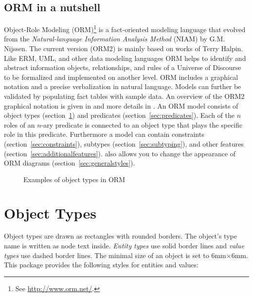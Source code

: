 \documentclass[a4paper,10pt]{article}
\begin{document}
\subsection*{ORM in a nutshell}
Object-Role Modeling (ORM)\footnote{See \url{http://www.orm.net/}.} is a fact-oriented modeling language that evolved from the \textit{Natural-language Information Analysis Method} (NIAM) by G.M. Nijssen. The current version (ORM2) is mainly based on works of Terry Halpin. Like ERM, UML, and other data modeling languages ORM helps to identify and abstract information objects, relationships, and rules of a Universe of Discourse to be formalized and implemented on another level. ORM includes a graphical notation and a precise verbalization in natural language. Models can further be validated by populating fact tables with sample data. An overview of the ORM2 graphical notation is given in \cite{Halpin2005} and more details in \cite{Halpin2008}. An ORM model consists of object types (section~\ref{sec:objecttypes}) and predicates  (section~\ref{sec:predicates}). Each of the $n$ roles of an $n$-ary predicate is connected to an object type that plays the specific role in this predicate. Furthermore a model can contain constraints (section~\ref{sec:constraints}), subtypes (section~\ref{sec:subtyping}), and other features (section~\ref{sec:additionalfeatures}). \tkzorm also allows you to change the appearance of ORM diagrams (section~\ref{sec:generalstyles}).

\begin{figure}[ht]
  \centering
  \caption{Examples of object types in ORM}
\end{figure}

\pagebreak
\section{Object Types}
\label{sec:objecttypes}
Object types are drawn as rectangles with rounded borders. The object's type name is written as node text inside. \emph{Entity types} use solid border lines and \emph{value types} use dashed border lines. The minimal size of an object is set to 6mm$\times$6mm. This package provides the following styles for entities and values:
\end{document}
